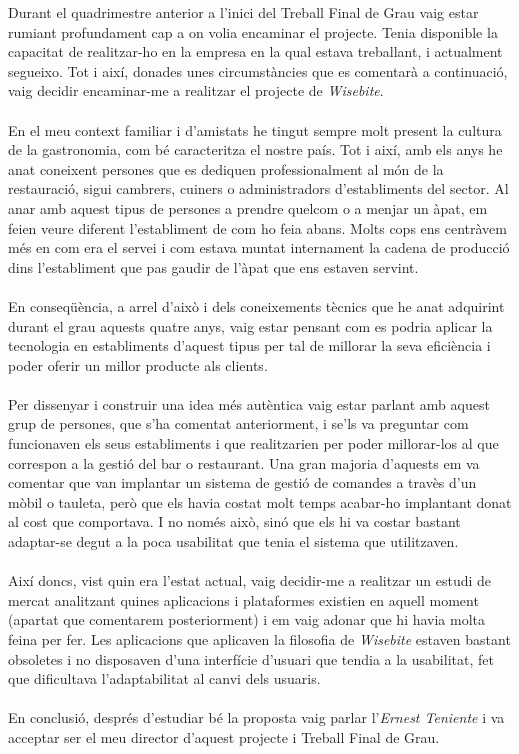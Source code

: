 Durant el quadrimestre anterior a l'inici del Treball Final de Grau vaig estar rumiant profundament cap a on volia encaminar el projecte. Tenia disponible la capacitat de realitzar-ho en la empresa en la qual estava treballant, i actualment segueixo. Tot i així, donades unes circumstàncies que es comentarà a continuació, vaig decidir encaminar-me a realitzar el projecte de \textit{Wisebite}.
\\\\
En el meu context familiar i d'amistats he tingut sempre molt present la cultura de la gastronomia, com bé caracteritza el nostre país. Tot i així, amb els anys he anat coneixent persones que es dediquen professionalment al món de la restauració, sigui cambrers, cuiners o administradors d'establiments del sector. Al anar amb aquest tipus de persones a prendre quelcom o a menjar un àpat, em feien veure diferent l'establiment de com ho feia abans. Molts cops ens centràvem més en com era el servei i com estava muntat internament la cadena de producció dins l'establiment que pas gaudir de l'àpat que ens estaven servint.
\\\\
En conseqüència, a arrel d'això i dels coneixements tècnics que he anat adquirint durant el grau aquests quatre anys, vaig estar pensant com es podria aplicar la tecnologia en establiments d'aquest tipus per tal de millorar la seva eficiència i poder oferir un millor producte als clients.
\\\\
Per dissenyar i construir una idea més autèntica vaig estar parlant amb aquest grup de persones, que s'ha comentat anteriorment, i se'ls va preguntar com funcionaven els seus establiments i que realitzarien per poder millorar-los al que correspon a la gestió del bar o restaurant. Una gran majoria d'aquests em va comentar que van implantar un sistema de gestió de comandes a travès d'un mòbil o tauleta, però que els havia costat molt temps acabar-ho implantant donat al cost que comportava. I no només això, sinó que els hi va costar bastant adaptar-se degut a la poca usabilitat que tenia el sistema que utilitzaven.
\\\\
\newpage
Així doncs, vist quin era l'estat actual, vaig decidir-me a realitzar un estudi de mercat analitzant quines aplicacions i plataformes existien en aquell moment (apartat que comentarem posteriorment) i em vaig adonar que hi havia molta feina per fer. Les aplicacions que aplicaven la filosofia de \textit{Wisebite} estaven bastant obsoletes i no disposaven d'una interfície d'usuari que tendia a la usabilitat, fet que dificultava l'adaptabilitat al canvi dels usuaris.
\\\\
En conclusió, després d'estudiar bé la proposta vaig parlar l'\textit{Ernest Teniente} i va acceptar ser el meu director d'aquest projecte i Treball Final de Grau.